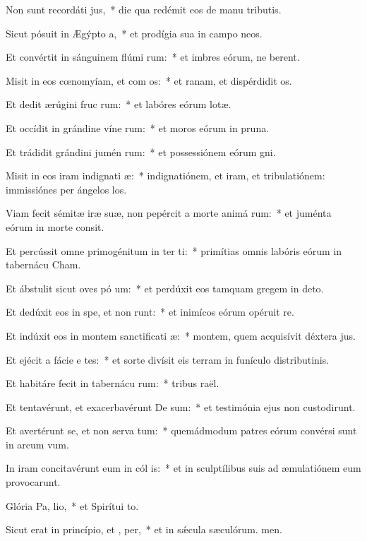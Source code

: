 \item Non sunt recordáti  jus,~* die qua redémit eos de manu tributis.
\item Sicut pósuit in Ægýpto  a,~* et prodígia sua in campo neos.
\item Et convértit in sánguinem flúmi rum:~* et imbres eórum, ne berent.
\item Misit in eos cœnomyíam, et com os:~* et ranam, et dispérdidit os.
\item Et dedit ærúgini fruc rum:~* et labóres eórum lotæ.
\item Et occídit in grándine víne rum:~* et moros eórum in pruna.
\item Et trádidit grándini jumén rum:~* et possessiónem eórum gni.
\item Misit in eos iram indignati æ:~* indignatiónem, et iram, et tribulatiónem: immissiónes per ángelos los.
\item Viam fecit sémitæ iræ suæ, non pepércit a morte animá rum:~* et juménta eórum in morte consit.
\item Et percússit omne primogénitum in ter ti:~* primítias omnis labóris eórum in tabernácu Cham.
\item Et ábstulit sicut oves pó um:~* et perdúxit eos tamquam gregem in deto.
\item Et dedúxit eos in spe, et non runt:~* et inimícos eórum opéruit re.
\item Et indúxit eos in montem sanctificati æ:~* montem, quem acquisívit déxtera jus.
\item Et ejécit a fácie e tes:~* et sorte divísit eis terram in funículo distributinis.
\item Et habitáre fecit in tabernácu rum:~* tribus raël.
\item Et tentavérunt, et exacerbavérunt De sum:~* et testimónia ejus non custodirunt.
\item Et avertérunt se, et non serva tum:~* quemádmodum patres eórum convérsi sunt in arcum vum.
\item In iram concitavérunt eum in cól is:~* et in sculptílibus suis ad æmulatiónem eum provocarunt.
\item Glória Pa,  lio,~* et Spirítui to.
\item Sicut erat in princípio, et ,  per,~* et in sǽcula sæculórum. men.
